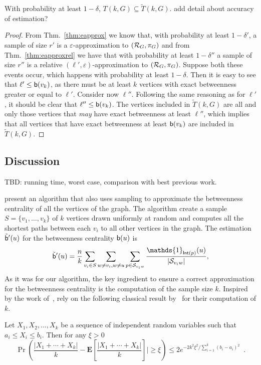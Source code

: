 \begin{lemma}
  With probability at least $1-\delta$, $T(k,G)\subseteq \tilde T(k,G)$.
  \XXX add detail about accuracy of estimation?
\end{lemma}
\begin{proof}
  From Thm.~\ref{thm:eapprox} we know that, with probability at least $1-\delta'$, a sample of size $r'$ is a
  $\varepsilon$-approximation to $(\mathcal{R}_G,\pi_G)$ and from
  Thm.~\ref{thm:eapproxrel} we have that with probability at least
  $1-\delta''$ a sample of size $r''$ is a relative
  $(\ell',\varepsilon)$-approximation to $(\mathcal{R}_G,\pi_G)$. Suppose both these events
  occur, which happens with probability at least $1-\delta$.
  Then it is easy to see that $\ell'\le\mathsf{b}(v_k)$, as there must be at least
  $k$ vertices with exact betweenness greater or equal to $\ell'$. 
  Consider now $\ell''$. Following the same reasoning as for $\ell'$, it should
  be clear that $\ell''\le\mathsf{b}(v_k)$. The vertices included in $\tilde T(k,G)$
  are all and only those vertices that \emph{may} have exact betweenness at least
  $\ell''$, which implies that all vertices that have exact betweenness at least
  $\mathsf{b}(v_k)$ are included in $\tilde T(k,G)$. 
\end{proof}

\subsection{Discussion}\label{sec:discussion}
\XXX TBD: running time, worst case, comparison with best previous work.

\citet{BrandesP07} present an algorithm that also uses sampling to approximate
the betweenness centrality of all the vertices of the graph. The algorithm
create a sample $S=\{v_1,\dotsc,v_k\}$ of $k$ vertices drawn uniformly at random 
and computes all the shortest paths between each $v_i$ to all other vertices in
the graph. The estimation $\tilde{\mathsf{b}}'(u)$ for the betweenness centrality
$\mathsf{b}(u)$ is
\[ 
\tilde\betw'(u)= \frac{n}{k}\sum_{v_i\in S}\sum_{w\neq v_i,w\neq
u}\sum_{p\in\mathcal{S}_{v_iw}}\frac{\mathds{1}_{\mathsf{Int}(p)}(u)}{|\mathcal{S}_{v_iw}|},
\]
As it was for our algorithm, the key ingredient to ensure a correct
approximation for the betweenness centrality is the computation of the sample
size $k$. Inspired by the work of~\citet{EppsteinW04}, \citet{BrandesP07} rely
on the following classical result by~\citet{Hoeffding63} for their computation
of $k$.

\begin{theorem}
  Let $X_1,X_2,\dotsc,X_k$ be a sequence of independent random variables
  such that $a_i\leq X_i\leq b_i$. Then for any $\xi > 0$
  \begin{equation}\label{eq:hoeffding}
    \Pr\left(\frac{|X_1+\dotsb+X_k|}{k}-\mathbf{E}\left[\frac{|X_1+\dotsb+X_k|}{k}\right]|\geq
    \xi\right)\leq 2e^{-2k^2\xi^2/\sum_{i=1}^{k}(b_{i}-a_{i})^2}\enspace.
  \end{equation}
\end{theorem}

